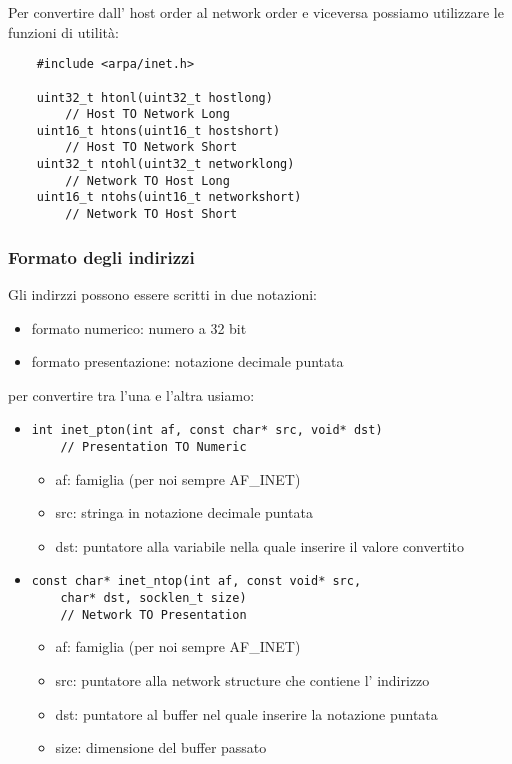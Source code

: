 Per convertire dall' host order al network order e viceversa possiamo utilizzare le funzioni di utilità:
\begin{verbatim}
    #include <arpa/inet.h>
    
    uint32_t htonl(uint32_t hostlong)
        // Host TO Network Long
    uint16_t htons(uint16_t hostshort)
        // Host TO Network Short
    uint32_t ntohl(uint32_t networklong)
        // Network TO Host Long
    uint16_t ntohs(uint16_t networkshort)
        // Network TO Host Short
\end{verbatim}

\subsubsection{Formato degli indirizzi}
Gli indirzzi possono essere scritti in due notazioni:
\begin{itemize}
    \item formato numerico: numero a 32 bit
    \item formato presentazione: notazione decimale puntata
\end{itemize}
per convertire tra l'una e l'altra usiamo:
\begin{itemize}
    \item 
        \begin{verbatim}
int inet_pton(int af, const char* src, void* dst)
    // Presentation TO Numeric
        \end{verbatim}
        \begin{itemize}
            \item af: famiglia (per noi sempre AF\_INET)
            \item src: stringa in notazione decimale puntata
            \item dst: puntatore alla variabile nella quale inserire il valore convertito
        \end{itemize}

    \item
        \begin{verbatim}
const char* inet_ntop(int af, const void* src,
    char* dst, socklen_t size)
    // Network TO Presentation
        \end{verbatim}
        \begin{itemize}
            \item af: famiglia (per noi sempre AF\_INET)
            \item src: puntatore alla network structure che contiene l' indirizzo
            \item dst: puntatore al buffer nel quale inserire la notazione puntata
            \item size: dimensione del buffer passato
        \end{itemize}
\end{itemize}

